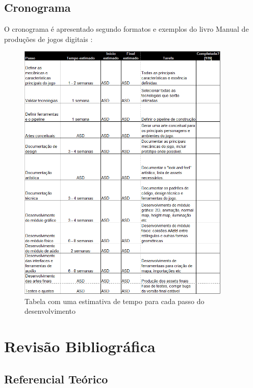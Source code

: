 \documentclass[12pt, 
openright, 
oneside, 
a4paper,    
brazil]{facom-ufu-abntex2}
\begin{document}
\section{Cronograma}
O cronograma é apresentado segundo formatos e exemplos do livro Manual de produções de jogos digitais \cite{Manualdejogosdigitais}:
\begin{figure}[!htb]
	\centering
	\includegraphics[width=4in]{imagens/cronograma.png}
	\caption{Tabela com uma estimativa de tempo para cada passo do desenvolvimento}
\end{figure}


\chapter{Revisão Bibliográfica}

\section{Referencial Teórico}
\label{sec:refteo}
\end{document}
